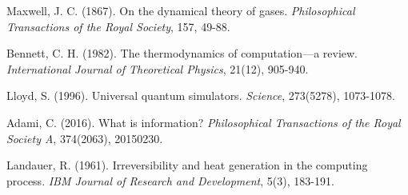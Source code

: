\documentclass[12pt,a4paper]{article}
\begin{document}
\begin{thebibliography}{99}

Maxwell, J. C. (1867). On the dynamical theory of gases. \textit{Philosophical Transactions of the Royal Society}, 157, 49-88.

Bennett, C. H. (1982). The thermodynamics of computation—a review. \textit{International Journal of Theoretical Physics}, 21(12), 905-940.

Lloyd, S. (1996). Universal quantum simulators. \textit{Science}, 273(5278), 1073-1078.

Adami, C. (2016). What is information? \textit{Philosophical Transactions of the Royal Society A}, 374(2063), 20150230.

Landauer, R. (1961). Irreversibility and heat generation in the computing process. \textit{IBM Journal of Research and Development}, 5(3), 183-191.

\end{thebibliography}
\end{document}
